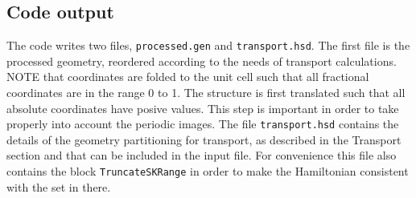 \subsection{Code output}

The code writes two files, \verb|processed.gen| and \verb|transport.hsd|. The first file is the 
processed geometry, reordered according to the needs of transport calculations. 
NOTE that coordinates are folded to the unit cell such that all fractional coordinates are in the 
range 0 to 1. The structure is first translated such that all absolute coordinates have posive 
values. 
This step is important in order to take properly into account the periodic images.
The file \verb|transport.hsd| contains the details of the geometry partitioning for transport, 
as described in the Transport section and that can be included in the input file.
For convenience this file also contains the block \verb|TruncateSKRange| in order to 
make the Hamiltonian consistent with the  set in there. 


